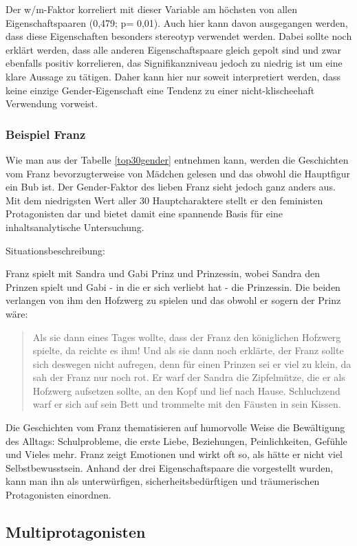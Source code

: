 Der w/m-Faktor korreliert mit dieser Variable am höchsten von allen
Eigenschaftspaaren (0,479; p= 0,01). Auch hier kann davon ausgegangen
werden, dass diese Eigenschaften besonders stereotyp verwendet werden.
Dabei sollte noch erklärt werden, dass alle anderen Eigenschaftspaare
gleich gepolt sind und zwar ebenfalls positiv korrelieren, das
Signifikanzniveau jedoch zu niedrig ist um eine klare Aussage zu
tätigen. Daher kann hier nur soweit interpretiert werden, dass keine
einzige Gender-Eigenschaft eine Tendenz zu einer nicht-klischeehaft
Verwendung vorweist.

\subsubsection{Beispiel Franz}

Wie man aus der Tabelle \ref{top30gender} entnehmen kann, werden die
Geschichten vom Franz bevorzugterweise von Mädchen gelesen und das
obwohl die Hauptfigur ein Bub ist. Der Gender-Faktor des lieben Franz
sieht jedoch ganz anders aus. Mit dem niedrigsten Wert aller 30
Hauptcharaktere stellt er den feministen Protagonisten dar und bietet
damit eine spannende Basis für eine inhaltsanalytische Untersuchung.

Situationsbeschreibung:

Franz spielt mit Sandra und Gabi Prinz und Prinzessin, wobei Sandra den
Prinzen spielt und Gabi - in die er sich verliebt hat - die Prinzessin.
Die beiden verlangen von ihm den Hofzwerg zu spielen und das obwohl er
sogern der Prinz wäre:
\blockcquote[30]{Noestlinger2010}{Als sie dann eines Tages wollte, dass der Franz den königlichen Hofzwerg spielte, da reichte es ihm! Und als sie dann noch erklärte, der Franz sollte sich deswegen nicht aufregen, denn für einen Prinzen sei er viel zu klein, da sah der Franz nur noch rot. Er warf der Sandra die Zipfelmütze, die er als Hofzwerg aufsetzen sollte, an den Kopf und lief nach Hause. Schluchzend warf er sich auf sein Bett und trommelte mit den Fäusten in sein Kissen.}
Die Geschichten vom Franz thematisieren auf humorvolle Weise die
Bewältigung des Alltags: Schulprobleme, die erste Liebe, Beziehungen,
Peinlichkeiten, Gefühle und Vieles mehr. Franz zeigt Emotionen und wirkt
oft so, als hätte er nicht viel Selbstbewusstsein. Anhand der drei
Eigenschaftspaare die vorgestellt wurden, kann man ihn als
unterwürfigen, sicherheitsbedürftigen und träumerischen Protagonisten
einordnen.

\subsection{Multiprotagonisten}

